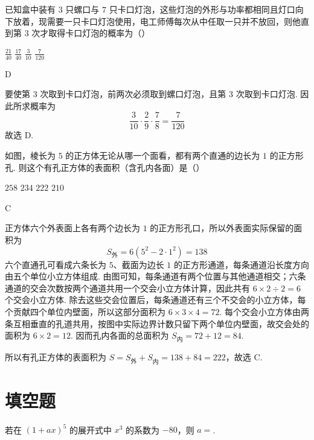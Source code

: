 \begin{problem}
已知盒中装有 \(3\) 只螺口与 \(7\) 只卡口灯泡，这些灯泡的外形与功率都相同且灯口向下放着，现需要一只卡口灯泡使用，电工师傅每次从中任取一只并不放回，则他直到第 \(3\) 次才取得卡口灯泡的概率为（\quad）

\choices
    {\( \frac{21}{40} \)}
    {\( \frac{17}{40} \)}
    {\( \frac{3}{10} \)}
    {\( \frac{7}{120} \)}
\end{problem}

\begin{answer}
D
\end{answer}

\begin{solution}
要使第 3 次取到卡口灯泡，前两次必须取到螺口灯泡，且第 3 次取到卡口灯泡. 因此所求概率为
\[
\frac{3}{10}\cdot\frac{2}{9}\cdot\frac{7}{8}=\frac{7}{120}
\]
故选 D.
\end{solution}

\begin{problem}
如图，棱长为 \(5\) 的正方体无论从哪一个面看，都有两个直通的边长为 \(1\) 的正方形孔. 则这个有孔正方体的表面积（含孔内各面）是（\quad）


\choices
    {\(258\)}
    {\(234\)}
    {\(222\)}
    {\(210\)}
\end{problem}

\begin{answer}
C
\end{answer}

\begin{solution}
正方体六个外表面上各有两个边长为 \(1\) 的正方形孔口，所以外表面实际保留的面积为
\[
S_{\text{外}}=6\left(5^2-2\cdot1^2\right)=138
\]
六个直通孔可看成六条长为 \(5\)、截面为边长 \(1\) 的正方形通道，每条通道沿长度方向由五个单位小立方体组成. 由图可知，每条通道有两个位置与其他通道相交；六条通道的交会次数按两个通道共用一个交会小立方体计算，因此共有 \(6\times2\div2=6\) 个交会小立方体. 除去这些交会位置后，每条通道还有三个不交会的小立方体，每个贡献四个单位内壁面，所以这部分面积为 \(6\times3\times4=72\). 每个交会小立方体由两条互相垂直的孔道共用，按图中实际边界计数只留下两个单位内壁面，故交会处的面积为 \(6\times2=12\). 因而孔内各面的总面积为 \(S_{\text{内}}=72+12=84\).

所以有孔正方体的表面积为 \(S=S_{\text{外}}+S_{\text{内}}=138+84=222\)，故选 C.
\end{solution}

\section{填空题}
\begin{problem}
若在 \((1 + a x)^5\) 的展开式中 \(x^3\) 的系数为 \(-80\)，则 \(a=\)\fillinblank{}.
\end{problem}

